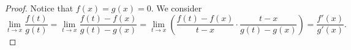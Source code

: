 \begin{Exercise}
	\begin{proof}
		Notice that $f(x) = g(x) = 0$.
		We consider
		$$
		\lim_{t\to x}\frac{f(t)}{g(t)}
		= \lim_{t\to x}\frac{f(t)-f(x)}{g(t)-g(x)}
		= \lim_{t\to x}\left( \frac{f(t)-f(x)}{t-x} \cdot \frac{t-x}{g(t)-g(x)} \right)
		= \frac{f'(x)}{g'(x)}.
		$$
	\end{proof}
\end{Exercise}